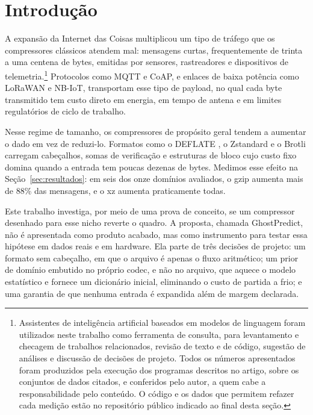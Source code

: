 \documentclass[12pt]{article}
\begin{document}
\section{Introdução}

A expansão da Internet das Coisas multiplicou um tipo de tráfego que os
compressores clássicos atendem mal: mensagens curtas, frequentemente de trinta
a uma centena de bytes, emitidas por sensores, rastreadores e dispositivos de
telemetria.\footnote{Assistentes de inteligência artificial baseados em modelos
de linguagem foram utilizados neste trabalho como ferramenta de consulta, para
levantamento e checagem de trabalhos relacionados, revisão de texto e de código,
sugestão de análises e discussão de decisões de projeto. Todos os números
apresentados foram produzidos pela execução dos programas descritos no artigo,
sobre os conjuntos de dados citados, e conferidos pelo autor, a quem cabe a
responsabilidade pelo conteúdo. O código e os dados que permitem refazer cada
medição estão no repositório público indicado ao final desta seção.}
Protocolos como MQTT e CoAP, e enlaces de baixa potência como LoRaWAN e NB-IoT,
transportam esse tipo de payload, no qual cada byte transmitido tem custo direto
em energia, em tempo de antena e em limites regulatórios de ciclo de trabalho.

Nesse regime de tamanho, os compressores de propósito geral tendem a aumentar o
dado em vez de reduzi-lo. Formatos como o DEFLATE \cite{deutsch:96}, o Zstandard
\cite{collet:21} e o Brotli \cite{alakuijala:16} carregam cabeçalhos, somas de
verificação e estruturas de bloco cujo custo fixo domina quando a entrada tem
poucas dezenas de bytes. Medimos esse efeito na Seção~\ref{sec:resultados}: em
seis dos onze domínios avaliados, o gzip aumenta mais de 88\% das mensagens, e o
xz aumenta praticamente todas.

Este trabalho investiga, por meio de uma prova de conceito, se um compressor
desenhado para esse nicho reverte o quadro. A proposta, chamada GhostPredict,
não é apresentada como produto acabado, mas como instrumento para testar essa
hipótese em dados reais e em hardware. Ela parte de três decisões de projeto: um
formato sem cabeçalho, em que o arquivo é apenas o fluxo aritmético; um prior de
domínio embutido no próprio codec, e não no arquivo, que aquece o modelo
estatístico e fornece um dicionário inicial, eliminando o custo de partida a
frio; e uma garantia de que nenhuma entrada é expandida além de margem
declarada.
\end{document}
